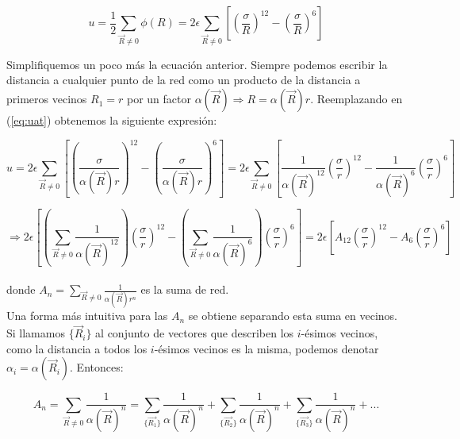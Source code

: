 \documentclass[a4paper]{article}
\begin{document}
\begin{equation}
\label{eq:uat}
u = \frac{1}{2}\sum_{\vec{R} \neq 0} \phi(R) = 2\epsilon\sum_{\vec{R} \neq 0}\left[\left( \frac{\sigma}{R}\right)^{12} - \left(\frac{\sigma}{R}\right)^{6} \right]
\end{equation}

Simplifiquemos un poco m\'as la ecuaci\'on anterior. Siempre podemos escribir la distancia a cualquier punto de la red como un producto de la distancia a primeros vecinos $R_{1} = r$ por un factor $\alpha(\vec{R}) \Rightarrow R = \alpha(\vec{R})r$. Reemplazando en (\ref{eq:uat}) obtenemos la siguiente expresi\'on:

\begin{equation}
\label{eq:uat2}
u = 2\epsilon\sum_{\vec{R} \neq 0}\left[\left( \frac{\sigma}{\alpha(\vec{R})r}\right)^{12} - \left(\frac{\sigma}{\alpha(\vec{R})r}\right)^{6} \right] = 2\epsilon\sum_{\vec{R} \neq 0}\left[\frac{1}{\alpha(\vec{R})^{12}}\left(\frac{\sigma}{r}\right)^{12} -  \frac{1}{\alpha(\vec{R})^{6}}\left(\frac{\sigma}{r}\right)^{6} \right]
\end{equation}

\begin{equation}
\label{eq:uat3}
\Rightarrow 2\epsilon\left[ \left( \sum_{\vec{R} \neq 0}\frac{1}{\alpha(\vec{R})^{12}} \right)\left(\frac{\sigma}{r}\right)^{12} - \left( \sum_{\vec{R} \neq 0}\frac{1}{\alpha(\vec{R})^{6}} \right)\left(\frac{\sigma}{r}\right)^{6} \right] = 2\epsilon\left[ A_{12}\left(\frac{\sigma}{r}\right)^{12} - A_{6}\left(\frac{\sigma}{r}\right)^{6} \right]
\end{equation}
\\

donde $A_{n} = \sum_{\vec{R} \neq 0} \frac{1}{\alpha(\vec{R})r^{n}}$ es la suma de red.\\

Una forma m\'as intuitiva para las $A_{n}$ se obtiene separando esta suma en vecinos. Si llamamos $\{\vec{R}_{i}\}$ al conjunto de vectores que describen los $i$-\'esimos vecinos, como la distancia a todos los $i$-\'esimos vecinos es la misma, podemos denotar $\alpha_{i} = \alpha(\vec{R}_{i})$. Entonces:

\begin{equation}
\label{eq:an}
A_{n} = \sum_{\vec{R} \neq 0} \frac{1}{\alpha(\vec{R})^{n}} = \sum_{\{\vec{R_{1}}\}} \frac{1}{\alpha(\vec{R})^{n}} + \sum_{\{\vec{R_{2}}\}} \frac{1}{\alpha(\vec{R})^{n}} + \sum_{\{\vec{R_{3}}\}} \frac{1}{\alpha(\vec{R})^{n}} + ...
\end{equation}
\end{document}
